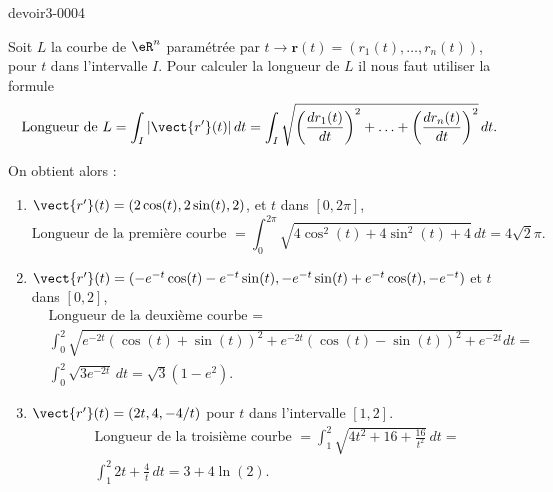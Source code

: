 \begin{corrige}{devoir3-0004}

Soit $L$ la courbe de $\eR^n$ paramétrée par $t\to \textbf{r}(t)= (r_1(t), \ldots, r_n(t))$, pour $t$ dans l'intervalle $I$. 
Pour calculer la longueur de $L$  il  nous faut utiliser la formule 
\begin{equation}
    \textrm{Longueur de } L = \int_{I} |\vect{r'}(t)|\, dt= \int_{I} \sqrt{\left(\frac{d r_1(t)}{dt}\right)^2+\ldots +\left(\frac{d r_n(t)}{dt}\right)^2}\, dt.
\end{equation}

On obtient alors :  
\begin{enumerate}
    \item $\vect{r'}(t)= (2\cos(t), 2\sin(t), 2)$, et $t$ dans $[0,2\pi]$,
  \begin{equation}
   \textrm{Longueur de la première courbe }= \int_0^{2\pi}  \sqrt{4\cos^2(t)+4\sin^2(t) + 4}\, dt= 4\sqrt{2}\pi.  
  \end{equation}
\item $\vect{r'}(t)= (-e^{-t}\cos(t)-e^{-t}\sin(t), -e^{-t}\sin(t)+e^{-t}\cos(t), -e^{-t})$ et  $t$ dans $[0,2]$, 
  \begin{equation}
    \begin{aligned}
      &\textrm{Longueur de la deuxième courbe }=\\
& \int_0^{2}  \sqrt{e^{-2t}(\cos(t)+\sin(t))^2+e^{-2t}(\cos(t)-\sin(t))^2+ e^{-2t}} dt= \\
    &\int_0^{2}  \sqrt{3e^{-2t}}\, dt= \sqrt{3}(1-e^{2}).
    \end{aligned}
  \end{equation}
\item $\vect{r'}(t)= (2t, 4, -4/t)$ pour $t$ dans l'intervalle $[1,2]$.  
 \begin{equation}
    \begin{aligned}
     & \textrm{Longueur de la troisième courbe }= \int_1^{2}  \sqrt{4t^2+16+ \frac{16}{t^2}}\, dt= \\
    &\int_1^{2}  2t+\frac{4}{t}\, dt= 3+4\ln(2).
    \end{aligned}
  \end{equation}
\end{enumerate}
\end{corrige}
